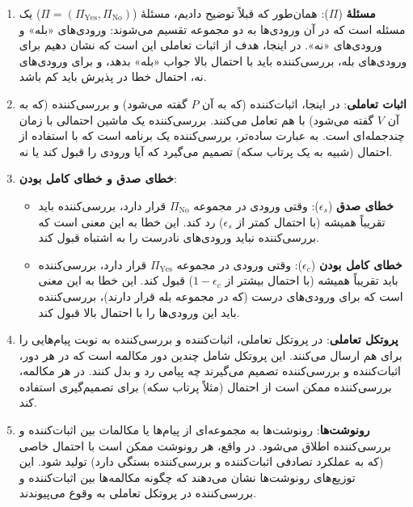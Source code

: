 	\begin{enumerate}
		\item \textbf{مسئلهٔ } 
		(\(\Pi\)):
		 همان‌طور که قبلاً توضیح دادیم، مسئلهٔ  (\(\Pi = (\Pi_{\text{Yes}}, \Pi_{\text{No}})\)) یک مسئله است که در آن ورودی‌ها به دو مجموعه تقسیم می‌شوند: ورودی‌های «بله» و ورودی‌های «نه». در اینجا، هدف از اثبات تعاملی این است که نشان دهیم برای ورودی‌های بله، بررسی‌کننده باید با احتمال بالا جواب «بله» بدهد، و برای ورودی‌های نه، احتمال خطا در پذیرش باید کم باشد.
		
		\item \textbf{اثبات تعاملی}: در اینجا، اثبات‌کننده (که به آن \(P\) گفته می‌شود) و بررسی‌کننده (که به آن \(V\) گفته می‌شود) با هم تعامل می‌کنند. بررسی‌کننده یک ماشین احتمالی با زمان چندجمله‌ای است. به عبارت ساده‌تر، بررسی‌کننده یک برنامه است که با استفاده از احتمال (شبیه به یک پرتاب سکه) تصمیم می‌گیرد که آیا ورودی را قبول کند یا نه.
		
		\item \textbf{خطای صدق و خطای کامل بودن}:
		\begin{itemize}
			\item \textbf{خطای صدق} (\(\epsilon_s\)): وقتی ورودی در مجموعه \(\Pi_{\text{No}}\) قرار دارد، بررسی‌کننده باید تقریباً همیشه (با احتمال کمتر از \(\epsilon_s\)) رد کند. این خطا به این معنی است که بررسی‌کننده نباید ورودی‌های نادرست را به اشتباه قبول کند.
			\item \textbf{خطای کامل بودن} (\(\epsilon_c\)): وقتی ورودی در مجموعه \(\Pi_{\text{Yes}}\) قرار دارد، بررسی‌کننده باید تقریباً همیشه (با احتمال بیشتر از \(1 - \epsilon_c\)) قبول کند. این خطا به این معنی است که برای ورودی‌های درست (که در مجموعه بله قرار دارند)، بررسی‌کننده باید این ورودی‌ها را با احتمال بالا قبول کند.
		\end{itemize}
		
		\item \textbf{پروتکل تعاملی}: در پروتکل تعاملی، اثبات‌کننده و بررسی‌کننده به نوبت پیام‌هایی را برای هم ارسال می‌کنند. این پروتکل شامل چندین دور مکالمه است که در هر دور، اثبات‌کننده و بررسی‌کننده تصمیم می‌گیرند چه پیامی رد و بدل کنند. در هر مکالمه، بررسی‌کننده ممکن است از احتمال (مثلاً پرتاب سکه) برای تصمیم‌گیری استفاده کند.
		
		\item \textbf{رونوشت‌ها}: رونوشت‌ها به مجموعه‌ای از پیام‌ها یا مکالمات بین اثبات‌کننده و بررسی‌کننده اطلاق می‌شود. در واقع، هر رونوشت ممکن است با احتمال خاصی (که به عملکرد تصادفی اثبات‌کننده و بررسی‌کننده بستگی دارد) تولید شود. این توزیع‌های رونوشت‌ها نشان می‌دهند که چگونه مکالمه‌ها بین اثبات‌کننده و بررسی‌کننده در پروتکل تعاملی به وقوع می‌پیوندند.
	\end{enumerate}
	
